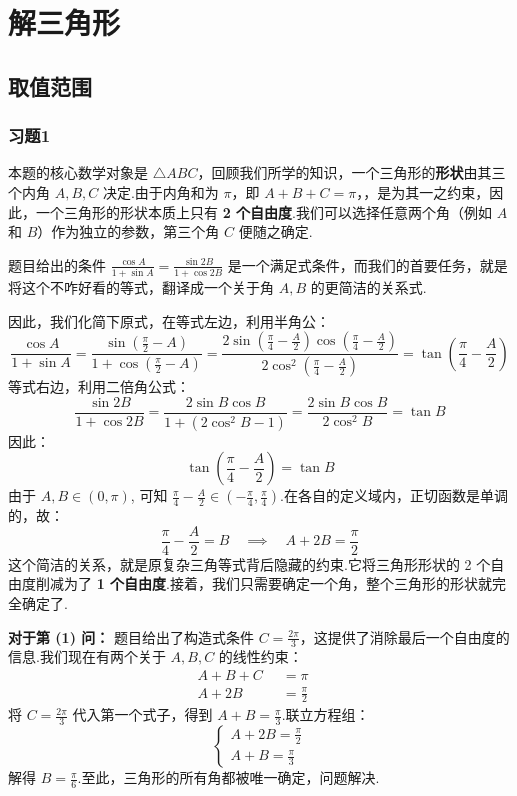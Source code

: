\section{解三角形}
\subsection{取值范围}

\subsubsection{习题1}
\begin{solution}
	本题的核心数学对象是 $\triangle ABC$，回顾我们所学的知识，一个三角形的\textbf{形状}由其三个内角 $A, B, C$ 决定.由于内角和为 $\pi$，即 $A+B+C=\pi$，，是为其一之约束，因此，一个三角形的形状本质上只有 \textbf{2 个自由度}.我们可以选择任意两个角（例如 $A$ 和 $B$）作为独立的参数，第三个角 $C$ 便随之确定.
	
	题目给出的条件 $\frac{\cos A}{1+\sin A} = \frac{\sin 2B}{1+\cos 2B}$ 是一个满足式条件，而我们的首要任务，就是将这个不咋好看的等式，翻译成一个关于角 $A, B$ 的更简洁的关系式.
	
	因此，我们化简下原式，在等式左边，利用半角公：
	\[
	\frac{\cos A}{1+\sin A} = \frac{\sin(\frac{\pi}{2}-A)}{1+\cos(\frac{\pi}{2}-A)} = \frac{2\sin(\frac{\pi}{4}-\frac{A}{2})\cos(\frac{\pi}{4}-\frac{A}{2})}{2\cos^2(\frac{\pi}{4}-\frac{A}{2})} = \tan\left(\frac{\pi}{4}-\frac{A}{2}\right)
	\]
	等式右边，利用二倍角公式：
	\[
	\frac{\sin 2B}{1+\cos 2B} = \frac{2\sin B \cos B}{1+(2\cos^2 B-1)} = \frac{2\sin B \cos B}{2\cos^2 B} = \tan B
	\]
	因此：
	\[
	\tan\left(\frac{\pi}{4}-\frac{A}{2}\right) = \tan B
	\]
	由于 $A, B \in (0, \pi)$, 可知 $\frac{\pi}{4}-\frac{A}{2} \in (-\frac{\pi}{4}, \frac{\pi}{4})$.在各自的定义域内，正切函数是单调的，故：
	\[
	\frac{\pi}{4}-\frac{A}{2} = B \quad \implies \quad A+2B = \frac{\pi}{2}
	\]
	这个简洁的关系，就是原复杂三角等式背后隐藏的约束.它将三角形形状的 2 个自由度削减为了 \textbf{1 个自由度}.接着，我们只需要确定一个角，整个三角形的形状就完全确定了.
	
	\textbf{对于第 (1) 问：}
	题目给出了构造式条件 $C = \frac{2\pi}{3}$，这提供了消除最后一个自由度的信息.我们现在有两个关于 $A, B, C$ 的线性约束：
	\begin{align*}
		A+B+C &= \pi \quad  \\
		A+2B \qquad &= \frac{\pi}{2} \quad 
	\end{align*}
	将 $C=\frac{2\pi}{3}$ 代入第一个式子，得到 $A+B = \frac{\pi}{3}$.联立方程组：
	\[
	\begin{cases}
		A+2B = \frac{\pi}{2} \\
		A+B = \frac{\pi}{3}
	\end{cases}
	\]
	解得 $B = \frac{\pi}{6}$.至此，三角形的所有角都被唯一确定，问题解决.
	

\end{solution}
